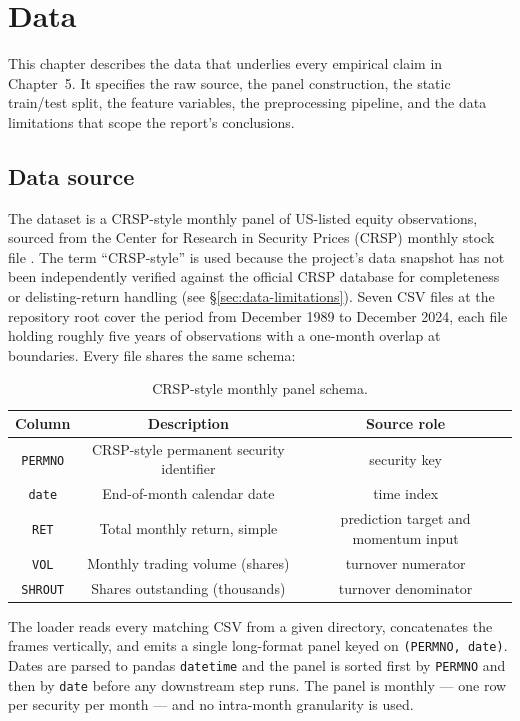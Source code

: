 \chapter{Data}\label{ch:data}

This chapter describes the data that underlies every empirical claim in Chapter~5. It specifies the raw source, the panel construction, the static train/test split, the feature variables, the preprocessing pipeline, and the data limitations that scope the report's conclusions.

\section{Data source}\label{sec:data-source}

The dataset is a CRSP-style monthly panel of US-listed equity observations, sourced from the Center for Research in Security Prices (CRSP) monthly stock file \cite{refA4}. The term ``CRSP-style'' is used because the project's data snapshot has not been independently verified against the official CRSP database for completeness or delisting-return handling (see \S\ref{sec:data-limitations}). Seven CSV files at the repository root cover the period from December 1989 to December 2024, each file holding roughly five years of observations with a one-month overlap at boundaries. Every file shares the same schema:

\begin{table}[H]
\centering
\caption{CRSP-style monthly panel schema.}\label{tab:crsp-schema}
\begin{tabular}{ccc}\toprule
Column & Description & Source role \\\midrule
\texttt{PERMNO} & CRSP-style permanent security identifier & security key \\
\texttt{date} & End-of-month calendar date & time index \\
\texttt{RET} & Total monthly return, simple & prediction target and momentum input \\
\texttt{VOL} & Monthly trading volume (shares) & turnover numerator \\
\texttt{SHROUT} & Shares outstanding (thousands) & turnover denominator \\
\bottomrule
\end{tabular}
\end{table}

The loader reads every matching CSV from a given directory, concatenates the frames vertically, and emits a single long-format panel keyed on \texttt{(PERMNO, date)}. Dates are parsed to pandas \texttt{datetime} and the panel is sorted first by \texttt{PERMNO} and then by \texttt{date} before any downstream step runs. The panel is monthly --- one row per security per month --- and no intra-month granularity is used.

